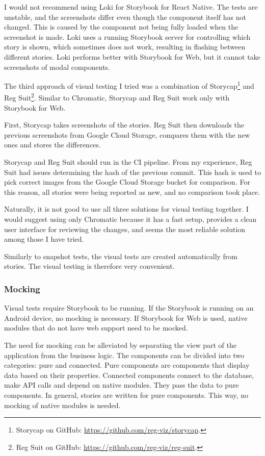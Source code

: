 \documentclass[
  digital, %
  table,   %
  oneside, %
  lof,     %
  lot,     %
]{fithesis3}
\begin{document}
I would not recommend using Loki for Storybook for React Native. The tests are unstable, and the screenshots differ even though the component itself has not changed. This is caused by the component not being fully loaded when the screenshot is made. Loki uses a running Storybook server for controlling which story is shown, which sometimes does not work, resulting in flashing between different stories.
Loki performs better with Storybook for Web, but it cannot take screenshots of modal components.

The third approach of visual testing I tried was a combination of Storycap\footnote{Storycap on GitHub: \url{https://github.com/reg-viz/storycap}.} and Reg Suit\footnote{Reg Suit on GitHub: \url{https://github.com/reg-viz/reg-suit}.}. Similar to Chromatic, Storycap and Reg Suit work only with Storybook for Web.

First, Storycap takes screenshots of the stories. Reg Suit then downloads the previous screenshots from Google Cloud Storage, compares them with the new ones and stores the differences. 

Storycap and Reg Suit should run in the CI pipeline. From my experience, Reg Suit had issues determining the hash of the previous commit. This hash is used to pick correct images from the Google Cloud Storage bucket for comparison. For this reason, all stories were being reported as new, and no comparison took place.

Naturally, it is not good to use all three solutions for visual testing together. I would suggest using only Chromatic because it has a fast setup, provides a clean user interface for reviewing the changes, and seems the most reliable solution among those I have tried.

Similarly to snapshot tests, the visual tests are created automatically from stories. The visual testing is therefore very convenient.

\subsubsection{Mocking}
Visual tests require Storybook to be running. If the Storybook is running on an Android device, no mocking is necessary. If Storybook for Web is used, native modules that do not have web support need to be mocked.

The need for mocking can be alleviated by separating the view part of the application from the business logic.
The components can be divided into two categories: pure and connected. Pure components are components that display data based on their properties. Connected components connect to the database, make API calls and depend on native modules. They pass the data to pure components. In general, stories are written for pure components. This way, no mocking of native modules is needed.
\end{document}
